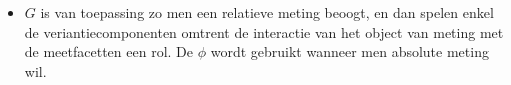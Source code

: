 {\begin{enumerate}
\begin{itemize}
	$\hat{\sigma}^2_{p, dp}$ \\

	We berekenen hiervoor eerst $\sigma^2_{abs.~meting}$
	\begin{align*}
		\sigma^2_{abs.~meting} 	&=  \dfrac{\hat{\sigma}^2_{k}}{n_k} + \dfrac{\hat{\sigma}^2_{p, dp}}{n_p} \\
								&=  \dfrac{{3.122}}{3} + \dfrac{{615.8+84.7}}{2}\\
								&=  1.0703 + 350.25 &= 351.3203
	\end{align*}
	Bijgevolg kan $\phi$ opgesteld worden door $\sigma^2_{abs. meting}$ en $\hat{\sigma}^2_{d}$ in te vullen in vergelijking \ref{eq.phi}:
	\begin{align*}
		\phi 	&=\dfrac{167.64}{167.64+  351.3203}\\
				&=\dfrac{167.64}{518.9603}=0.3230
	\end{align*}
	\item $G$ is van toepassing zo men een relatieve meting beoogt, en dan spelen
enkel de veriantiecomponenten omtrent de interactie van het object van meting
met de meetfacetten een rol. De $\phi$ wordt gebruikt wanneer men absolute meting
wil.
	\end{itemize}
	
	
\end{enumerate}
}

